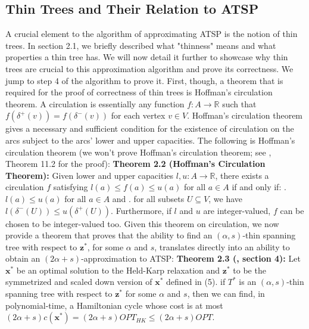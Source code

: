 \documentclass[oneside]{projectpaper} %
\begin{document}
\subsection{Thin Trees and Their Relation to ATSP}
A crucial element to the algorithm of approximating ATSP is the notion of thin trees. In section 2.1, we briefly described what "thinness" means and what properties a thin tree has. We will now detail it further to showcase why thin trees are crucial to this approximation algorithm and prove its correctness. \newline
\indent We jump to step 4 of the algorithm to prove it. First, though, a theorem that is required for the proof of correctness of thin trees is Hoffman's circulation theorem. A circulation is essentially any function $f : A \rightarrow \mathbb{R}$ such that $f(\delta^+(v)) = f(\delta^-(v))$ for each vertex $v \in V$. Hoffman's circulation theorem gives a necessary and sufficient condition for the existence of circulation on the arcs subject to the arcs' lower and upper capacities. The following is Hoffman's circulation theorem (we won't prove Hoffman's circulation theorem; see \cite{Sch03}, Theorem 11.2 for the proof):
\newline
\newline
\textbf{Theorem 2.2 (Hoffman's Circulation Theorem\cite{Sch03}):} Given lower and upper capacities $l, u : A \rightarrow \mathbb{R}$, there exists a circulation $f$ satisfying $l(a) \leq f(a) \leq u(a)$ for all $a \in A$ if and only if:
\newline {}. $l(a) \leq u(a)$ for all $a \in A$ and
\newline {}. for all subsets $U \subseteq V$, we have $l(\delta^-(U)) \leq u(\delta^+(U))$.
\newline Furthermore, if $l$ and $u$ are integer-valued, $f$ can be chosen to be integer-valued too.
\newline
\newline
Given this theorem on circulation, we now provide a theorem that proves that the ability to find an $(\alpha, s)$-thin spanning tree with respect to $\textbf{z}^*$, for some $\alpha$ and $s$, translates directly into an ability to obtain an $(2\alpha + s)$-approximation to ATSP:
\newline
\newline
\textbf{Theorem 2.3 (\cite{AGM10}, section 4):} Let $\textbf{x}^*$ be an optimal solution to the Held-Karp relaxation and $\textbf{z}^*$ to be the symmetrized and scaled down version of $\textbf{x}^*$ defined in (5). if $T^*$ is an $(\alpha, s)$-thin spanning tree with respect to $\textbf{z}^*$ for some $\alpha$ and $s$, then we can find, in polynomial-time, a Hamiltonian cycle whose cost is at most $(2\alpha + s)c(\textbf{x}^*) = (2\alpha + s)OPT_{HK} \leq (2\alpha + s)OPT$.
\end{document}
